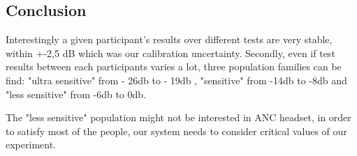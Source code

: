 \subsection{Conclusion}

Interestingly a given participant's results over different tests are very stable, within +-2,5 dB which was our calibration uncertainty.  Secondly, even if test results between each participants varies a lot, three population families can be find: "ultra sensitive" from - 26db to - 19db , "sensitive" from -14db to -8db  and "less sensitive" from -6db to 0db. 

The "less sensitive" population might not be interested in ANC headset, in order to satisfy most of the people, our system needs to consider critical values of our experiment.




